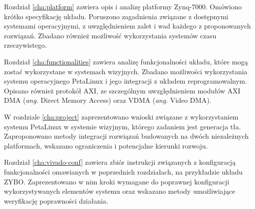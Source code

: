 Rozdział \ref{cha:platform} zawiera opis i analizę platformy Zynq-7000. Omówiono krótko specyfikację układu. Poruszono zagadnienia związane z dostępnymi systemami operacyjnymi, z uwzględnieniem zalet i wad każdego z proponowanych rozwiązań. Zbadano również możliwość wykorzystania systemów czasu rzeczywistego.

Rozdział \ref{cha:functionalities} zawiera analizę funkcjonalności układu, które mogą zostać wykorzystane w systemach wizyjnych. Zbadano możliwości wykorzystania systemu operacyjnego PetaLinux i jego integracji z układem reprogramowalnym. Opisano również protokół AXI, ze szczególnym uwzględnieniem modułów AXI DMA (\emph{ang.} Direct Memory Access) oraz VDMA (\emph{ang.} Video DMA).

W rozdziale \ref{cha:project} zaprezentowano wnioski związane z wykorzystaniem systemu PetaLinux w systemie wizyjnym, którego zadaniem jest generacja tła. Zaproponowano metody integracji rozwiązań budowanych na dwóch niezależnych platformach, wskazano ograniczenia i potencjalne kierunki rozwoju.

Rozdział \ref{cha:vivado-conf} zawiera zbiór instrukcji związanych z konfiguracją funkcjonalności omawianych w poprzednich rozdziałach, na przykładzie układu ZYBO. Zaprezentowano w nim kroki wymagane do poprawnej konfiguracji wykorzystywanych elementów systemu oraz wskazano metody umożliwiające weryfikację poprawności działania.